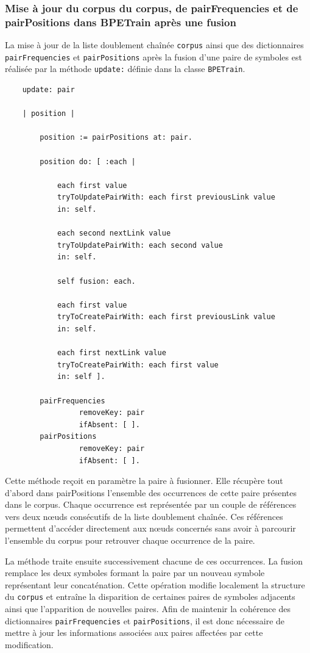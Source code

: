 \documentclass[12pt,a4paper]{report}
\begin{document}
	\subsubsection{Mise à jour du corpus du corpus, de pairFrequencies et de pairPositions dans BPETrain après une fusion}
	
	La mise à jour de la liste doublement chaînée \texttt{corpus} ainsi que des dictionnaires \texttt{pairFrequencies} et \texttt{pairPositions} après la fusion d’une paire de symboles est réalisée par la méthode \texttt{update:} définie dans la classe \texttt{BPETrain}.
	
	\begin{verbatim}
	update: pair
		
	| position |
		
		position := pairPositions at: pair.
		
		position do: [ :each |
		
			each first value
			tryToUpdatePairWith: each first previousLink value
			in: self.
		
			each second nextLink value
			tryToUpdatePairWith: each second value
			in: self.
		
			self fusion: each.
		
			each first value
			tryToCreatePairWith: each first previousLink value
			in: self.
		
			each first nextLink value
			tryToCreatePairWith: each first value
			in: self ].
		
		pairFrequencies
				 removeKey: pair
				 ifAbsent: [ ].
		pairPositions
				 removeKey: pair
				 ifAbsent: [ ].
	\end{verbatim}
	
	Cette méthode reçoit en paramètre la paire à fusionner. Elle récupère tout d’abord dans pairPositions l’ensemble des occurrences de cette paire présentes dans le corpus. Chaque occurrence est représentée par un couple de références vers deux nœuds consécutifs de la liste doublement chaînée. Ces références permettent d’accéder directement aux nœuds concernés sans avoir à parcourir l’ensemble du corpus pour retrouver chaque occurrence de la paire.
	
	La méthode traite ensuite successivement chacune de ces occurrences. La fusion remplace les deux symboles formant la paire par un nouveau symbole représentant leur concaténation. Cette opération modifie localement la structure du \texttt{corpus} et entraîne la disparition de certaines paires de symboles adjacents ainsi que l’apparition de nouvelles paires. Afin de maintenir la cohérence des dictionnaires \texttt{pairFrequencies} et \texttt{pairPositions}, il est donc nécessaire de mettre à jour les informations associées aux paires affectées par cette modification.
	
\end{document}

